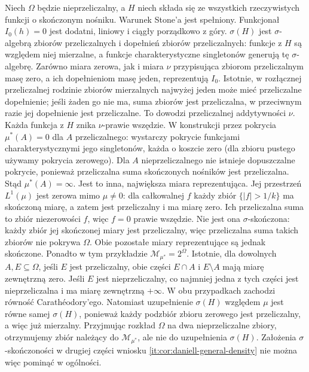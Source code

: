 \begin{przyklad}
\label{it:ex:daniell-nonunique}
Niech $\Omega$ będzie nieprzeliczalny, a $H$ niech
składa się ze wszystkich rzeczywistych funkcji
o skończonym nośniku. Warunek Stone'a jest spełniony.
Funkcjonał $I_0(h)=0$ jest dodatni, liniowy i ciągły
porządkowo z góry. $\sigma(H)$ jest $\sigma$-algebrą
zbiorów przeliczalnych i dopełnień zbiorów przeliczalnych:
funkcje z $H$ są względem niej mierzalne, a funkcje
charakterystyczne singletonów generują tę $\sigma$-algebrę.
Zarówno miara zerowa, jak i miara $\nu$ przypisująca
zbiorom przeliczalnym masę zero, a ich dopełnieniom
masę jeden, reprezentują $I_0$.
Istotnie, w rozłącznej przeliczalnej rodzinie
zbiorów mierzalnych najwyżej jeden może mieć
przeliczalne dopełnienie; jeśli żaden go nie ma,
suma zbiorów jest przeliczalna, w przeciwnym razie
jej dopełnienie jest przeliczalne.
To dowodzi przeliczalnej addytywności $\nu$.
Każda funkcja z $H$ znika $\nu$-prawie wszędzie.
W konstrukcji przez pokrycia $\mu^*(A)=0$ dla
$A$ przeliczalnego: wystarczy pokrycie funkcjami
charakterystycznymi jego singletonów, każda o koszcie
zero (dla zbioru pustego używamy pokrycia zerowego).
Dla $A$ nieprzeliczalnego nie istnieje dopuszczalne
pokrycie, ponieważ przeliczalna suma skończonych
nośników jest przeliczalna. Stąd $\mu^*(A)=\infty$.
Jest to inna, największa miara reprezentująca.
Jej przestrzeń $L^1(\mu)$ jest zerowa mimo $\mu\ne0$:
dla całkowalnej $f$ każdy zbiór $\{|f|>1/k\}$
ma skończoną miarę, a zatem jest przeliczalny
i ma miarę zero. Ich przeliczalna suma to zbiór
niezerowości $f$, więc $f=0$ prawie wszędzie.
Nie jest ona $\sigma$-skończona: każdy zbiór jej
skończonej miary jest przeliczalny, więc przeliczalna
suma takich zbiorów nie pokrywa $\Omega$.
Obie pozostałe miary reprezentujące są jednak skończone.
Ponadto w tym przykładzie
$\mathcal M_{\mu^*}=2^\Omega$.
Istotnie, dla dowolnych $A,E\subseteq\Omega$,
jeśli $E$ jest przeliczalny, obie części
$E\cap A$ i $E\setminus A$ mają miarę zewnętrzną zero.
Jeśli $E$ jest nieprzeliczalny, co najmniej jedna z tych
części jest nieprzeliczalna i ma miarę zewnętrzną
$+\infty$. W obu przypadkach zachodzi równość
Carathéodory'ego. Natomiast uzupełnienie $\sigma(H)$
względem $\mu$ jest równe samej $\sigma(H)$, ponieważ
każdy podzbiór zbioru zerowego jest przeliczalny,
a więc już mierzalny. Przyjmując rozkład $\Omega$
na dwa nieprzeliczalne zbiory, otrzymujemy zbiór
należący do $\mathcal M_{\mu^*}$, ale nie do
uzupełnienia $\sigma(H)$. Założenia
$\sigma$-skończoności w drugiej części wniosku
\ref{it:cor:daniell-general-density} nie można więc
pominąć w ogólności.


\end{przyklad}
